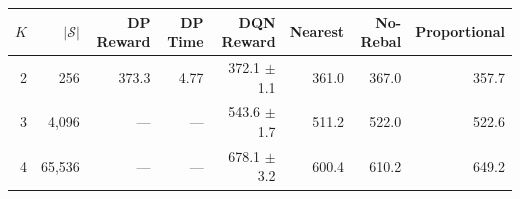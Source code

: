 \begin{tabular}{r r r r r r r r}
\toprule
$K$ & $|\mathcal{S}|$ & DP Reward & DP Time & DQN Reward & Nearest & No-Rebal & Proportional \\
\midrule
2 & 256 & 373.3 & 4.77 & 372.1 $\pm$ 1.1 & 361.0 & 367.0 & 357.7 \\
3 & 4,096 & --- & --- & 543.6 $\pm$ 1.7 & 511.2 & 522.0 & 522.6 \\
4 & 65,536 & --- & --- & 678.1 $\pm$ 3.2 & 600.4 & 610.2 & 649.2 \\
\bottomrule
\end{tabular}
